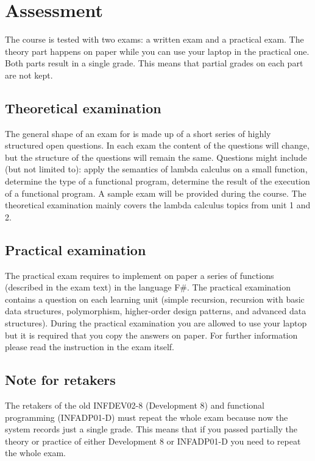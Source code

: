 \section{Assessment}
The course is tested with two exams: a written exam and a practical exam. The theory part happens on paper while you can use your laptop in the practical one. Both parts result in a single grade. This means that partial grades on each part are not kept.

\subsection{Theoretical examination \modulecode}
The general shape of an exam for \texttt{\modulecode} is made up of a short series of highly structured open questions.
In each exam the content of the questions will change, but the structure of the questions will remain the same. Questions might include (but not limited to): apply the semantics of lambda calculus on a small function, determine the type of a functional program, determine the result of the execution of a functional program. A sample exam will be provided during the course. The theoretical examination mainly covers the lambda calculus topics from unit 1 and 2.

\subsection{Practical examination \modulecode}
The practical exam requires to implement on paper a series of functions (described in the exam text) in the language F\#. The practical examination contains a question on each learning unit (simple recursion, recursion with basic data structures, polymorphism, higher-order design patterns, and advanced data structures). During the practical examination you are allowed to use your laptop but it is required that you copy the answers on paper. For further information please read the instruction in the exam itself.

\subsection{Note for retakers}
The retakers of the old INFDEV02-8 (Development 8) and functional programming (INFADP01-D) must repeat the whole exam because now the system records just a single grade. This means that if you passed partially the theory or practice of either Development 8 or INFADP01-D you need to repeat the whole exam.
